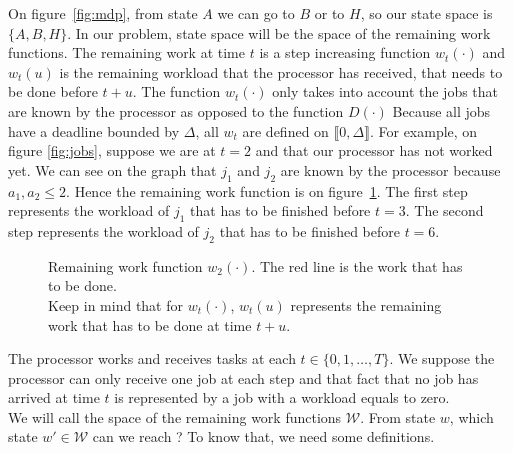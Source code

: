 \documentclass[
10pt, %
a4paper, %
oneside, %
headinclude,footinclude, %
BCOR5mm, %
]{scrartcl}
\newcommand{\W}{\mathcal{W}}
\begin{document}
On figure~\ref{fig:mdp}, from state $A$ we can go to $B$ or to $H$, so our state
space is $\{A,B,H\}$. In our problem, state space will be the space of
the remaining work functions. 
The remaining work at time $t$ is a step increasing function
$w_t(\cdot)$ and $w_t(u)$ is the remaining workload that the processor
has received, that needs to be done before $t+u$. The function $w_t(\cdot)$
only takes into account the jobs that are known by the processor as
opposed to the function $D(\cdot)$
Because all jobs have a deadline bounded by $\Delta$, all $w_t$ are
defined on $\llbracket 0,\Delta\rrbracket$. For example, on figure
\ref{fig:jobs}, suppose we are at $t=2$ and that our processor has not
worked yet. We can see on the graph that $j_1$ and $j_2$ are known by
the processor because $a_1,a_2\leq 2$. Hence the remaining work
function is on figure~\ref{fig:workfun}. The first step represents the
workload of $j_1$ that has to be finished before $t=3$. The second
step represents the workload of $j_2$ that has to be finished before
$t=6$.\\

\begin{figure}
  \centering
  \caption{Remaining work function $w_2(\cdot)$. 
    The red line is the work that has to be done.\\
    Keep in mind that for $w_t(\cdot)$, $w_t(u)$ represents the
  remaining work that has to be done at time $t+u$.}
  \label{fig:workfun}
\end{figure}

The processor works and receives tasks at each
$t\in\{0,1,\dots,T\}$. We suppose the processor can only receive one
job at each step and that fact that no job has arrived at time $t$ is
represented by a job with a workload equals to zero.\\

We will call the space of the remaining work functions $\W$. From state
$w$, which state $w'\in\W$ can we reach ? To know that, we need some
definitions.\\
\end{document}
